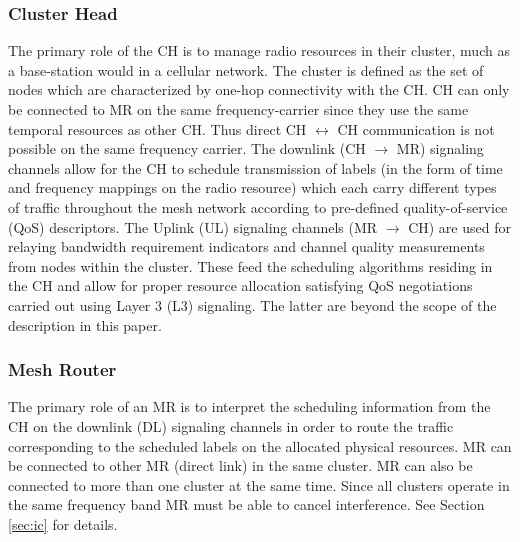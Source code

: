 \documentclass[a4paper,twocolumn,journal]{IEEEtran}
\begin{document}

\subsubsection{Cluster Head}
The primary role of the CH is to manage radio resources in their cluster, much as a base-station would in a cellular network. The cluster is defined as the set of nodes which are characterized by one-hop connectivity with the CH. 
CH can only be connected to MR on the same frequency-carrier since they use the same temporal resources as other CH. Thus direct CH $\leftrightarrow$ CH communication is not possible on the same frequency carrier. The downlink (CH $\rightarrow$ MR) signaling channels allow for the CH to schedule transmission of labels (in the form of time and frequency mappings on the radio resource) which each carry different types of traffic throughout the mesh network according to pre-defined quality-of-service (QoS) descriptors. The Uplink (UL) signaling channels (MR $\rightarrow$ CH) are used for relaying bandwidth requirement indicators and channel quality measurements from nodes within the cluster. These feed the scheduling algorithms residing in the CH and allow for proper resource allocation satisfying QoS negotiations carried out using Layer 3 (L3) signaling.  The latter are beyond the scope of the description in this paper.

\subsubsection{Mesh Router}
The primary role of an MR is to interpret the scheduling information from the CH on the downlink (DL) signaling channels in order to route the traffic corresponding to the scheduled labels on the allocated physical resources. MR can be connected to other MR (direct link) in the same cluster. MR can also be connected to more than one cluster at the same time. Since all clusters operate in the same frequency band MR must be able to cancel interference. See Section \ref{sec:ic} for details.
\end{document}
